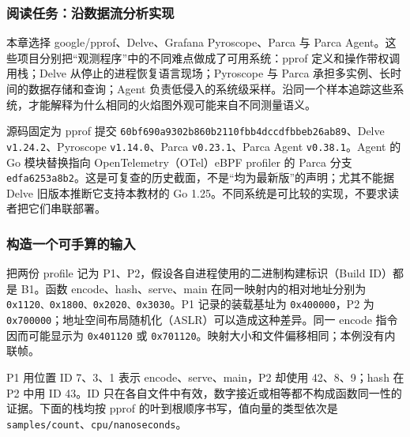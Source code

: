 \documentclass[UTF8,fontset=fandol,openany,11pt]{ctexbook}
\begin{document}
\subsubsection{阅读任务：沿数据流分析实现}
本章选择 google/pprof、Delve、Grafana Pyroscope、Parca 与 Parca Agent。这些项目分别把“观测程序”中的不同难点做成了可用系统：pprof 定义和操作带权调用栈；Delve 从停止的进程恢复语言现场；Pyroscope 与 Parca 承担多实例、长时间的数据存储和查询；Agent 负责低侵入的系统级采样。沿同一个样本追踪这些系统，才能解释为什么相同的火焰图外观可能来自不同测量语义。

源码固定为 pprof 提交 \texttt{60bf690a93\allowbreak{}02b860b211\allowbreak{}0fbb4dccdf\allowbreak{}bbeb26ab89}、Delve \texttt{v1.\allowbreak{}24.\allowbreak{}2}、Pyroscope \texttt{v1.\allowbreak{}14.\allowbreak{}0}、Parca \texttt{v0.\allowbreak{}23.\allowbreak{}1}、Parca Agent \texttt{v0.\allowbreak{}38.\allowbreak{}1}。Agent 的 Go 模块替换指向 OpenTelemetry（OTel）eBPF profiler 的 Parca 分支 \texttt{edfa6253a8b2}。这是可复查的历史截面，不是“均为最新版”的声明；尤其不能据 Delve 旧版本推断它支持本教材的 Go 1.25。不同系统是可比较的实现，不要求读者把它们串联部署。\cite{proj-pprof} \cite{proj-delve} \cite{proj-pyroscope} \cite{proj-parca} \cite{proj-parca-agent}

\subsubsection{构造一个可手算的输入}
把两份 profile 记为 P1、P2，假设各自进程使用的二进制构建标识（Build ID）都是 B1。函数 encode、hash、serve、main 在同一映射内的相对地址分别为 \texttt{0x1120、0x1800、0x2020、0x3030}。P1 记录的装载基址为 \texttt{0x400000}，P2 为 \texttt{0x700000}；地址空间布局随机化（ASLR）可以造成这种差异。同一 encode 指令因而可能显示为 \texttt{0x401120} 或 \texttt{0x701120}。映射大小和文件偏移相同；本例没有内联帧。

P1 用位置 ID 7、3、1 表示 encode、serve、main，P2 却使用 42、8、9；hash 在 P2 中用 ID 43。ID 只在各自文件中有效，数字接近或相等都不构成函数同一性的证据。下面的栈均按 pprof 的叶到根顺序书写，值向量的类型依次是 \texttt{samples/\allowbreak{}count}、\texttt{cpu/\allowbreak{}nanoseconds}。
\end{document}
